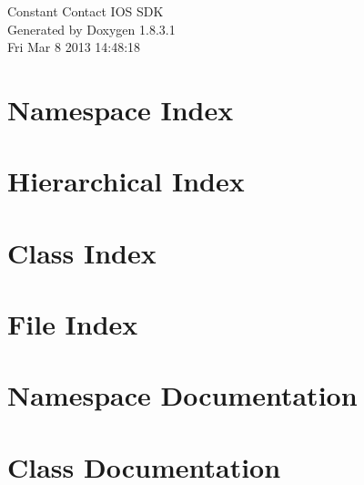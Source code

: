\documentclass{book}
\begin{document}
\hypersetup{pageanchor=false,citecolor=blue}
\begin{titlepage}
\vspace*{7cm}
\begin{center}
{\Large Constant Contact I\-O\-S S\-D\-K }\\
\vspace*{1cm}
{\large Generated by Doxygen 1.8.3.1}\\
\vspace*{0.5cm}
{\small Fri Mar 8 2013 14:48:18}\\
\end{center}
\end{titlepage}
\clearemptydoublepage
{}
\tableofcontents
\clearemptydoublepage
{}
\hypersetup{pageanchor=true,citecolor=blue}
\chapter{Namespace Index}

\chapter{Hierarchical Index}

\chapter{Class Index}

\chapter{File Index}

\chapter{Namespace Documentation}

\chapter{Class Documentation}







































\end{document}
